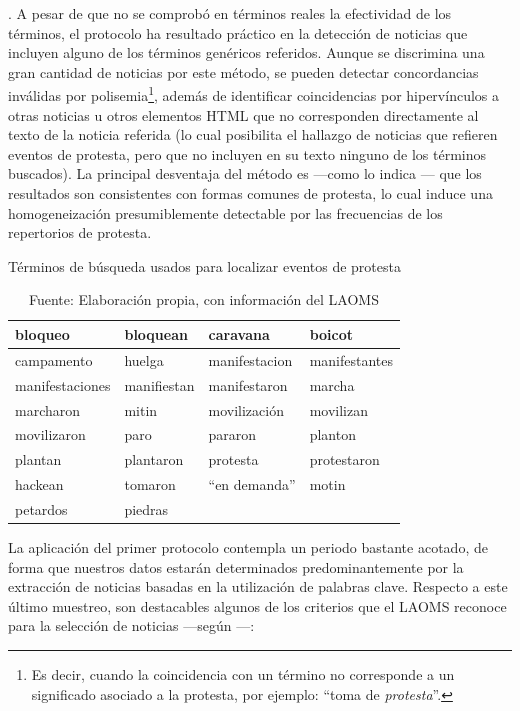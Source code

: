 \documentclass[letterpaper, 11pt]{book}
\theoremstyle{definition}
\theoremstyle{remark}
\begin{document}
\begin{itemize}
{    }. 
    A pesar de que no se comprobó en términos reales la efectividad de los términos, el protocolo ha resultado práctico en la detección de noticias que incluyen alguno de los términos genéricos referidos. 
    Aunque se discrimina una gran cantidad de noticias por este método, se pueden detectar concordancias inválidas por polisemia\footnote{
	Es decir, cuando la coincidencia con un término no corresponde a un significado asociado a la protesta, por ejemplo: ``toma de \emph{protesta}''.
    }, 
    además de identificar coincidencias por hipervínculos a otras noticias u otros elementos HTML que no corresponden directamente al texto de la noticia referida (lo cual posibilita el hallazgo de noticias que refieren eventos de protesta, pero que no incluyen en su texto ninguno de los términos buscados). La principal desventaja del método es ---como lo indica \citet{2010_Strawn_keywordSearch}--- que los resultados son consistentes con formas comunes de protesta, lo cual induce una homogeneización presumiblemente detectable por las frecuencias de los repertorios de protesta.
\end{itemize}



\begin{table}[!hbt]
\center
\footnotesize
\caption{Términos de búsqueda usados para localizar eventos de protesta}
\label{TerminosBusqueda}
\begin{tabular}{ | l | l | l | l | } 
\hline
bloqueo & bloquean & caravana & boicot\\
\hline
campamento & huelga & manifestacion & manifestantes\\
\hline
manifestaciones & manifiestan & manifestaron & marcha\\
\hline
marcharon & mitin & movilización & movilizan\\
\hline
movilizaron & paro & pararon & planton\\
\hline
plantan & plantaron & protesta & protestaron\\
\hline
hackean & tomaron & ``en demanda'' & motin\\
\hline
petardos & piedras & & \\
\hline
\end{tabular}
\par\bigskip
\caption*{\small Fuente: Elaboración propia, con información del LAOMS \citep[68]{2017_Cadena_ManualLAOMS}}
\end{table}


La aplicación del primer protocolo contempla un periodo bastante acotado, de forma que nuestros datos estarán determinados predominantemente por la extracción de noticias basadas en la utilización de palabras clave. 
Respecto a este último muestreo, son destacables algunos de los criterios que el LAOMS reconoce para la selección de noticias ---según \citet{2017_Cadena_ManualLAOMS}---:
\end{document}

